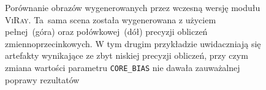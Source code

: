 \begin{enumerate}
\begin{figure}[H]
\centering
{}
\caption[Porównanie obrazów wygenerowanych przez wczesną wersję modułu \textsc{ViRay} za pomocą liczb o różnej precyzji]{Porównanie obrazów wygenerowanych przez wczesną wersję modułu \textsc{ViRay}. Ta~sama scena została wygenerowana z użyciem pełnej~(góra) oraz połówkowej~(dół) precyzji obliczeń zmiennoprzecinkowych. W tym drugim przykładzie uwidaczniają się artefakty wynikające ze zbyt niskiej precyzji obliczeń, przy czym zmiana wartości parametru \texttt{CORE\_BIAS} nie dawała zauważalnej poprawy rezultatów}
\label{ch3:img:float_vs_half}
\end{figure}
\end{enumerate}

